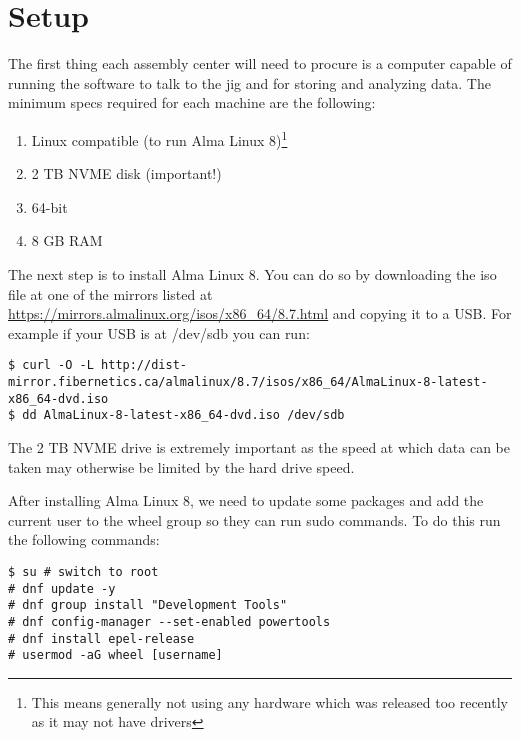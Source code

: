 \documentclass[12pt,openright,twoside]{report}
\begin{document}
\chapter{Setup}
\label{chapter:setup}
The first thing each assembly center will need to procure is a computer capable
of running the software to talk to the jig and for storing and analyzing data.
The minimum specs required for each machine are the following:
\begin{enumerate}
\item Linux compatible (to run Alma Linux 8)\footnote{This means generally not using any hardware which was released too recently as it may not have drivers}
\item 2 TB NVME disk (important!)
\item 64-bit
\item 8 GB RAM
\end{enumerate}
The next step is to install Alma Linux 8. You can do so by downloading the iso
file at one of the mirrors listed at
\url{https://mirrors.almalinux.org/isos/x86_64/8.7.html} and copying it to a
USB. For example if your USB is at /dev/sdb you can run:
\begin{mdframed}[backgroundcolor=light-gray, roundcorner=10pt,leftmargin=1, rightmargin=1, innerleftmargin=15, innertopmargin=15,innerbottommargin=15, outerlinewidth=1, linecolor=light-gray,roundcorner=20pt]
\begin{lstlisting}
$ curl -O -L http://dist-mirror.fibernetics.ca/almalinux/8.7/isos/x86_64/AlmaLinux-8-latest-x86_64-dvd.iso
$ dd AlmaLinux-8-latest-x86_64-dvd.iso /dev/sdb
\end{lstlisting}
\end{mdframed}

The 2 TB NVME drive is extremely important as the speed at which data can be
taken may otherwise be limited by the hard drive speed.

After installing Alma Linux 8, we need to update some packages and add the
current user to the wheel group so they can run sudo commands. To do this run
the following commands:

\begin{mdframed}[backgroundcolor=light-gray, roundcorner=10pt,leftmargin=1, rightmargin=1, innerleftmargin=15, innertopmargin=15,innerbottommargin=15, outerlinewidth=1, linecolor=light-gray,roundcorner=20pt]
\begin{lstlisting}
$ su # switch to root
# dnf update -y
# dnf group install "Development Tools"
# dnf config-manager --set-enabled powertools
# dnf install epel-release
# usermod -aG wheel [username]
\end{lstlisting}
\end{mdframed}
\end{document}

